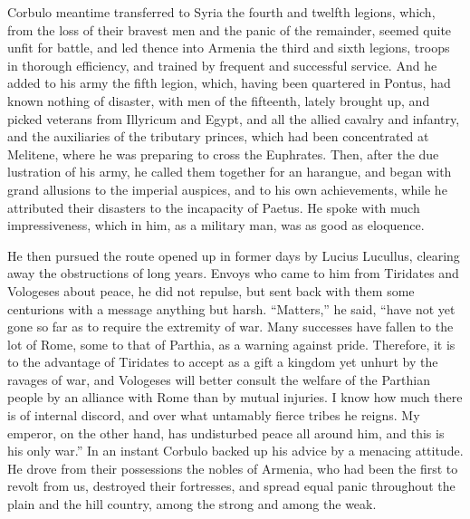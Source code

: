 
Corbulo meantime transferred to Syria the fourth and twelfth legions, which, from the loss of their bravest men and the panic of the remainder, seemed quite unfit for battle, and led thence into Armenia the third and sixth legions, troops in thorough efficiency, and trained by frequent and successful service. And he added to his army the fifth legion, which, having been quartered in Pontus, had known nothing of disaster, with men of the fifteenth, lately brought up, and picked veterans from Illyricum and Egypt, and all the allied cavalry and infantry, and the auxiliaries of the tributary princes, which had been concentrated at Melitene, where he was preparing to cross the Euphrates. Then, after the due lustration of his army, he called them together for an harangue, and began with grand allusions to the imperial auspices, and to his own achievements, while he attributed their disasters to the incapacity of Paetus. He spoke with much impressiveness, which in him, as a military man, was as good as eloquence.


He then pursued the route opened up in former days by Lucius Lucullus, clearing away the obstructions of long years. Envoys who came to him from Tiridates and Vologeses about peace, he did not repulse, but sent back with them some centurions with a message anything but harsh. ``Matters,'' he said, ``have not yet gone so far as to require the extremity of war. Many successes have fallen to the lot of Rome, some to that of Parthia, as a warning against pride. Therefore, it is to the advantage of Tiridates to accept as a gift a kingdom yet unhurt by the ravages of war, and Vologeses will better consult the welfare of the Parthian people by an alliance with Rome than by mutual injuries. I know how much there is of internal discord, and over what untamably fierce tribes he reigns. My emperor, on the other hand, has undisturbed peace all around him, and this is his only war.'' In an instant Corbulo backed up his advice by a menacing attitude. He drove from their possessions the nobles of Armenia, who had been the first to revolt from us, destroyed their fortresses, and spread equal panic throughout the plain and the hill country, among the strong and among the weak.



